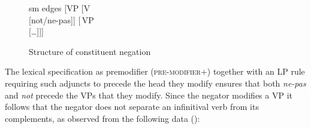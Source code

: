\documentclass[output=paper
 	        ,biblatex
                ,babelshorthands
                ,newtxmath
                ,draftmode
                ,colorlinks, citecolor=brown
]{langscibook}
\begin{document}
\begin{exe}
\begin{xlist}
\begin{exe}
\begin{xlist}
\begin{figure}
	\begin{forest}
		sm edges
		[VP
			[V\\
					[not/ne-pas]]
			[\,VP\\
					[\ldots]]]
	\end{forest}
\caption{Structure of constituent negation}\label{negation-not-vp-mod}
\end{figure}
\noindent
The lexical specification as premodifier (\textsc{pre-modifier}+) together with an LP rule requiring
such adjuncts to precede the head they modify \crossrefchapterp[\page \pageref{lp-pre-modifier}]{order} ensures that
both \textit{ne-pas} and \textit{not} precede the VPs that they modify.
Since the negator modifies a VP it follows that the negator does not separate an infinitival verb
from its complements, as observed from the following data (\citealp[]{KS:02}):

\eal
{} \label{negation-35a}
 \label{negation-35b}
\zl

\eal
{} \label{negation-34a}
 \label{negation-34b}
\zl


\end{xlist}
\end{exe}
\end{xlist}
\end{exe}
\end{document}
